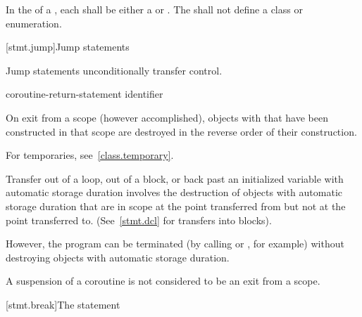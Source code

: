 \pnum
In the  of a ,
each  shall be either a 
or . The  shall not define a
class or enumeration.%

[stmt.jump]{Jump statements}%

\pnum
Jump statements unconditionally transfer control.
%

%
%
%
%
%
%
\begin{bnf}
\br
     \terminal{;}\br
     \terminal{;}\br
      \terminal{;}\br
    coroutine-return-statement\br
     identifier \terminal{;}
\end{bnf}

\pnum
{}%
%
On exit from a scope (however accomplished), objects with  that have been constructed in that scope are destroyed
in the reverse order of their construction.
\begin{note}
For temporaries,
see~\ref{class.temporary}.
\end{note}
Transfer out of a loop, out of a block, or back
past
an initialized variable with automatic storage duration involves the
destruction of objects with automatic storage duration that are in
scope at the point transferred from but not at the point transferred to.
(See~\ref{stmt.dcl} for transfers into blocks).
\begin{note}
However, the program can be terminated (by calling
%
%
 or
%
%
, for example) without
destroying objects with automatic storage duration.
\end{note}
\begin{note}
A suspension of a coroutine is not considered to be an exit from a scope.
\end{note}

[stmt.break]{The  statement}%


